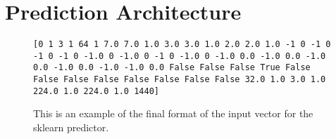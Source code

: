 


\section{Prediction Architecture}

\begin{figure}
\texttt{[0 1 3 1 64 1 7.0 7.0 1.0 3.0 3.0 1.0 2.0 2.0 1.0 -1 0 -1 0 -1 0 -1 0 -1.0 0 -1.0 0 -1 0 -1.0 0 -1.0 0.0 -1.0 0.0 -1.0 0.0 -1.0 0.0 -1.0 -1.0 0.0 False False False True False False False False False False False False 32.0 1.0 3.0 1.0 224.0 1.0 224.0 1.0 1440]}
\caption{This is an example of the final format of the input vector for the sklearn predictor.}
\label{input_vector}
\end{figure}

